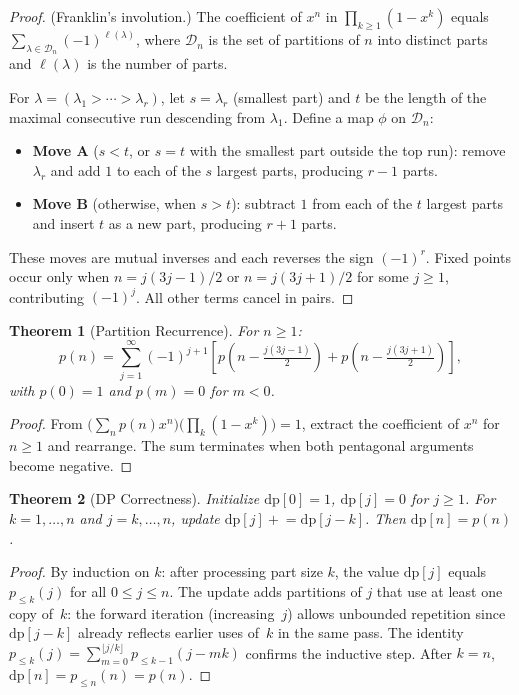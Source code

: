 \documentclass[11pt]{article}
\newtheorem{theorem}{Theorem}
\begin{document}
\begin{proof}
(Franklin's involution.) The coefficient of $x^n$ in $\prod_{k \geq 1}(1-x^k)$ equals $\sum_{\lambda \in \mathcal{D}_n}(-1)^{\ell(\lambda)}$, where $\mathcal{D}_n$ is the set of partitions of $n$ into distinct parts and $\ell(\lambda)$ is the number of parts.

For $\lambda = (\lambda_1 > \cdots > \lambda_r)$, let $s = \lambda_r$ (smallest part) and $t$ be the length of the maximal consecutive run descending from $\lambda_1$. Define a map $\phi$ on $\mathcal{D}_n$:
\begin{itemize}
    \item \textbf{Move A} ($s < t$, or $s = t$ with the smallest part outside the top run): remove $\lambda_r$ and add $1$ to each of the $s$ largest parts, producing $r - 1$ parts.
    \item \textbf{Move B} (otherwise, when $s > t$): subtract $1$ from each of the $t$ largest parts and insert $t$ as a new part, producing $r + 1$ parts.
\end{itemize}
These moves are mutual inverses and each reverses the sign $(-1)^r$. Fixed points occur only when $n = j(3j-1)/2$ or $n = j(3j+1)/2$ for some $j \geq 1$, contributing $(-1)^j$. All other terms cancel in pairs.
\end{proof}

\begin{theorem}[Partition Recurrence]
For $n \geq 1$:
\[
p(n) = \sum_{j=1}^{\infty} (-1)^{j+1} \left[p\!\left(n - \tfrac{j(3j-1)}{2}\right) + p\!\left(n - \tfrac{j(3j+1)}{2}\right)\right],
\]
with $p(0) = 1$ and $p(m) = 0$ for $m < 0$.
\end{theorem}

\begin{proof}
From $\bigl(\sum_n p(n)x^n\bigr)\bigl(\prod_k (1-x^k)\bigr) = 1$, extract the coefficient of $x^n$ for $n \geq 1$ and rearrange. The sum terminates when both pentagonal arguments become negative.
\end{proof}

\begin{theorem}[DP Correctness]
Initialize $\mathrm{dp}[0] = 1$, $\mathrm{dp}[j] = 0$ for $j \geq 1$. For $k = 1, \ldots, n$ and $j = k, \ldots, n$, update $\mathrm{dp}[j] \mathrel{+}= \mathrm{dp}[j-k]$. Then $\mathrm{dp}[n] = p(n)$.
\end{theorem}

\begin{proof}
By induction on $k$: after processing part size $k$, the value $\mathrm{dp}[j]$ equals $p_{\le k}(j)$ for all $0 \leq j \leq n$. The update adds partitions of $j$ that use at least one copy of~$k$: the forward iteration (increasing~$j$) allows unbounded repetition since $\mathrm{dp}[j - k]$ already reflects earlier uses of~$k$ in the same pass. The identity $p_{\le k}(j) = \sum_{m=0}^{\lfloor j/k \rfloor} p_{\le k-1}(j - mk)$ confirms the inductive step. After $k = n$, $\mathrm{dp}[n] = p_{\le n}(n) = p(n)$.
\end{proof}
\end{document}
